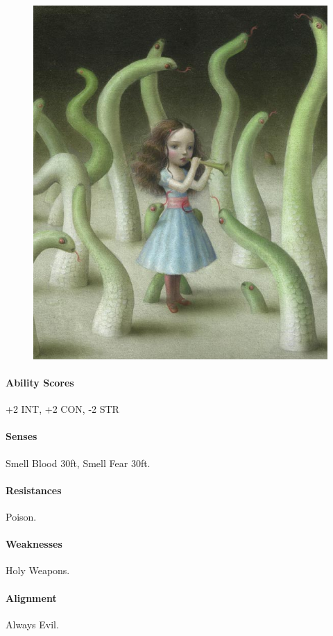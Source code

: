 \begin{multicols}{2}
    \begin{figure}[h]
\includegraphics[width=\columnwidth]{incubi-celesti}
\end{figure}
    \paragraph{Ability Scores} +2 INT, +2 CON, -2 STR
    \paragraph{Senses} Smell Blood 30ft, Smell Fear 30ft.  
    \paragraph{Resistances} Poison.
    \paragraph{Weaknesses} Holy Weapons. 
    
    \paragraph{Alignment} Always Evil. 
    

\end{multicols}
